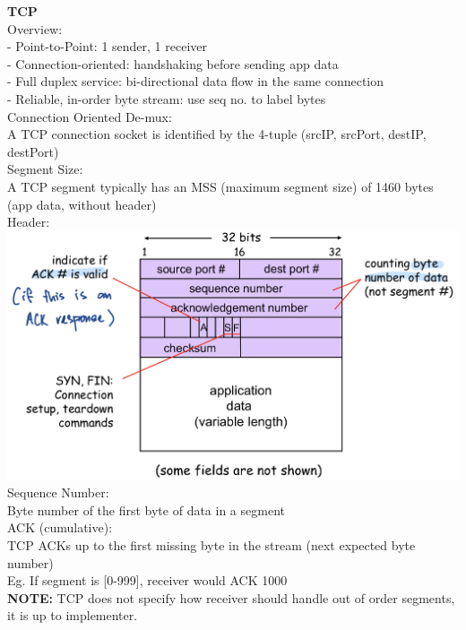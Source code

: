 \documentclass[10pt, a4paper]{article}
\newcommand{\highlight}[1]{{\color{red}\textbf{#1}}}
\newcommand{\blue}[1]{{\color{MidnightBlue}#1}}
\begin{document}
\begin{multicols*}{3}
		\textbf{TCP}\\
		Overview:\\
		- Point-to-Point: 1 sender, 1 receiver\\
		- Connection-oriented: handshaking before sending app data\\
		- Full duplex service: bi-directional data flow in the same connection\\
		- Reliable, in-order byte stream: use seq no. to label bytes\\

		Connection Oriented De-mux:\\
		A TCP connection socket is identified by the 4-tuple (srcIP, srcPort, destIP, destPort)\\

		Segment Size:\\
		A TCP segment typically has an MSS (maximum segment size) of 1460 bytes (app data, without header)\\

		Header:\\
		\includegraphics[scale=.14]{./assets/tcpHeader}\\

		Sequence Number:\\
		\blue{Byte number} of the \blue{first} byte of data in a segment\\

		ACK (cumulative):\\
		TCP ACKs up to the first missing byte in the stream (next expected byte number)\\
		Eg. If segment is [0-999], receiver would ACK 1000\\
		\highlight{NOTE:} TCP does not specify how receiver should handle \blue{out of order} segments, it is up to implementer.\\


\end{multicols*}
\end{document}

